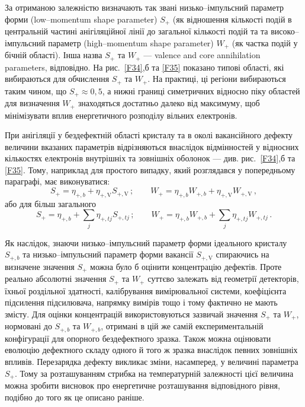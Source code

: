 За отриманою залежністю визначають так звані низько--імпульсний параметр форми
(low--momentum shape parameter) $S_+$ (як відношення кількості подій в центральній частині
анігіляційної лінії до загальної кількості подій та
та високо--імпульсний параметр (high--momentum shape parameter) $W_+$ (як частка подій у бічній області).
Інша назва $S_+$ та $W_+$ --- valence and core annihilation parameters, відповідно.
На рис.~\ref{F34},б та \ref{F35} показано типові області, які вибираються для обчислення $S_+$ та $W_+$.
На практиці, ці регіони вибираються таким чином, що $S_+\approx0,5$,
а нижні границі симетричних відносно піку областей для визначення $W_+$ знаходяться достатньо далеко від
максимуму, щоб мінімізувати вплив енергетичного розподілу вільних електронів.

При анігіляції у бездефектній області кристалу та в околі вакансійного дефекту
величини вказаних параметрів
відрізняються внаслідок відмінностей у відносних кількостях електронів внутрішніх
та зовнішніх оболонок --- див. рис.~\ref{F34},б та \ref{F35}.
Тому, наприклад для простого випадку, який розглядався у попередньому параграфі,
має виконуватися:
\begin{equation*}
S_+=\eta_{+,b}+\eta_{+,\mathrm{V}}S_{+,\mathrm{V}}\,;\qquad
W_+=\eta_{+,b}W_{+,b}+\eta_{+,\mathrm{V}}W_{+,\mathrm{V}}\,,
\end{equation*}
або для більш загального
\begin{equation*}
S_+=\eta_{+,b}+\sum_j\eta_{+,tj}S_{+,tj}\,;\qquad
W_+=\eta_{+,b}W_{+,b}+\sum_j\eta_{+,tj}W_{+,tj}\,.
\end{equation*}

Як наслідок, знаючи низько--імпульсний параметр форми ідеального кристалу $S_{+,b}$
та низько--імпульсний параметр форми вакансії $S_{+,\mathrm{V}}$
спираючись на визначене значення $S_+$ можна було б оцінити
концентрацію дефектів.
Проте реально абсолютні значення $S_+$ та $W_+$ суттєво залежать
від геометрії детекторів, їхньої роздільної здатності, калібрування
вимірювальної системи, коефіцієнта підсилення підсилювача,
напрямку вимірів тощо і тому фактично не мають змісту.
Для оцінки концентрацій використовуються зазвичай
значення $S_+$ та $W_+$, нормовані до $S_{+,b}$ та $W_{+,b}$,
отримані в цій же самій експериментальній  конфігурації
для опорного бездефектного зразка.
Також можна оцінювати еволюцію дефектного складу одного й того ж зразка внаслідок
певних зовнішніх впливів.
Перезарядка дефекту викликає зміни, насамперед, у величині параметра $S_+$.
Тому за розташуванням стрибка на температурній залежності
цієї величина можна зробити висновок
про енергетичне розташування відповідного рівня,
подібно до того як це описано раніше.



